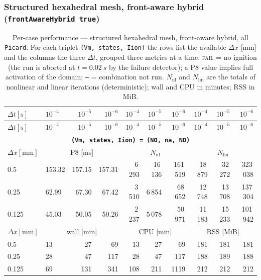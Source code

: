 \documentclass[11pt,a4paper]{article}
\newcommand{\code}[1]{\texttt{\small #1}}
\begin{document}
\subsubsection{Structured hexahedral mesh, front-aware hybrid (\code{frontAwareHybrid true})}
\label{sec:res2d:hexaT}
\begin{center}\footnotesize
\begin{longtable}{l|lrr|rrr|rrr}
\caption{Per-case performance --- structured hexahedral mesh, front-aware hybrid, all \code{Picard}. For each triplet \code{(Vm, states, Iion)} the rows list the available $\Delta x$ [mm] and the columns the three $\Delta t$, grouped three metrics at a time. \textsc{fail} = no ignition (the run is aborted at $t=\SI{0.02}{s}$ by the failure detector); a P8 value implies full activation of the domain; \texttt{--} = combination not run. $N_{\mathrm{nl}}$ and $N_{\mathrm{lin}}$ are the totals of nonlinear and linear iterations (deterministic); wall and CPU in minutes; RSS in MiB.}\label{tab:res2d:hexaT}\\
\toprule $ \Delta t [\text{s}]$ & $10^{-4}$ & $10^{-5}$ & $10^{-6}$ & $10^{-4}$ & $10^{-5}$ & $10^{-6}$ & $10^{-4}$ & $10^{-5}$ & $10^{-6}$\\ \midrule\endfirsthead
\toprule $ \Delta t [\text{s}]$ & $10^{-4}$ & $10^{-5}$ & $10^{-6}$ & $10^{-4}$ & $10^{-5}$ & $10^{-6}$ & $10^{-4}$ & $10^{-5}$ & $10^{-6}$\\ \midrule\endhead
\multicolumn{10}{c}{\textbf{\code{(Vm, states, Iion) = (NO, na, NO)}}}\\\hline
$ \Delta x [\text{mm}] $ & \multicolumn{3}{c|}{P8 [ms]} & \multicolumn{3}{c|}{$N_{\mathrm{nl}}$} & \multicolumn{3}{c|}{$N_{\mathrm{lin}}$}\\
0.5 & 153.32 & 157.15 & 157.31 & 6\,293 & 16\,136 & 161\,519 & 18\,879 & 32\,272 & 323\,038\\
0.25 & 62.99 & 67.30 & 67.42 & 3\,510 & 6\,854 & 68\,652 & 12\,748 & 13\,708 & 137\,304\\
0.125 & 45.03 & 50.05 & 50.26 & 2\,237 & 5\,078 & 50\,971 & 11\,183 & 15\,233 & 101\,942\\
\hline
$ \Delta x [\text{mm}] $ & \multicolumn{3}{c|}{wall [min]} & \multicolumn{3}{c|}{CPU [min]} & \multicolumn{3}{c|}{RSS [MiB]}\\
0.5 & 13 & 27 & 69 & 13 & 27 & 69 & 181 & 181 & 181\\
0.25 & 28 & 47 & 117 & 28 & 47 & 117 & 188 & 189 & 188\\
0.125 & 69 & 131 & 341 & 108 & 211 & 1119 & 212 & 212 & 212\\

\end{longtable}
\end{center}
\end{document}
